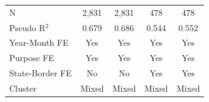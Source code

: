 \begin{tabular*}{\textwidth}{@{\extracolsep{\fill}}lcccc}
   \hline
   N         & 2,831         & 2,831         & 478           & 478\\  
   Pseudo R$^2$         & 0.679         & 0.686         & 0.544         & 0.552\\  
   Year-Month FE        & Yes           & Yes           & Yes           & Yes\\  
   Purpose FE           & Yes           & Yes           & Yes           & Yes\\  
   State-Border FE      & No            & No            & Yes           & Yes\\  
   Cluster              & Mixed & Mixed & Mixed & Mixed\\  
   \bottomrule
\end{tabular*}
\par\endgroup
